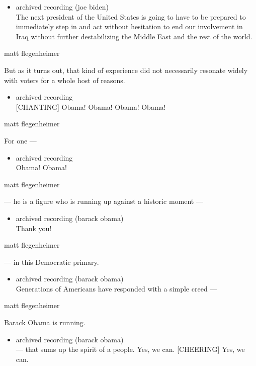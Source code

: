 \begin{itemize}
\tightlist
\item
  archived recording (joe biden)\\
  The next president of the United States is going to have to be
  prepared to immediately step in and act without hesitation to end our
  involvement in Iraq without further destabilizing the Middle East and
  the rest of the world.
\end{itemize}

matt flegenheimer

But as it turns out, that kind of experience did not necessarily
resonate widely with voters for a whole host of reasons.

\begin{itemize}
\tightlist
\item
  archived recording\\
  {[}CHANTING{]} Obama! Obama! Obama! Obama!
\end{itemize}

matt flegenheimer

For one ---

\begin{itemize}
\tightlist
\item
  archived recording\\
  Obama! Obama!
\end{itemize}

matt flegenheimer

--- he is a figure who is running up against a historic moment ---

\begin{itemize}
\tightlist
\item
  archived recording (barack obama)\\
  Thank you!
\end{itemize}

matt flegenheimer

--- in this Democratic primary.

\begin{itemize}
\tightlist
\item
  archived recording (barack obama)\\
  Generations of Americans have responded with a simple creed ---
\end{itemize}

matt flegenheimer

Barack Obama is running.

\begin{itemize}
\tightlist
\item
  archived recording (barack obama)\\
  --- that sums up the spirit of a people. Yes, we can. {[}CHEERING{]}
  Yes, we can.
\end{itemize}

